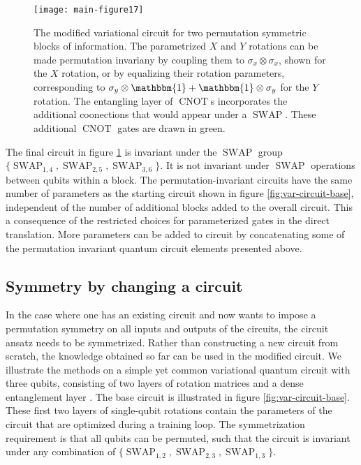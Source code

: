 \documentclass[%
 reprint,
 amsmath,amssymb,
 aps,
]{revtex4-2}
\newcommand{\SWAP}{\operatorname{SWAP}}
\newcommand{\CNOT}{\operatorname{CNOT}}
\theoremstyle{definition}%
\begin{document}
\begin{figure}[h]
    \centering
\texttt{[image: main-figure17]}
    \caption{The modified variational circuit for two permutation symmetric blocks of information. The parametrized $X$ and $Y$ rotations can be made permutation invariany by coupling them to $\sigma_x \otimes \sigma_x$, shown for the $X$ rotation, or by equalizing their rotation parameters, corresponding to $\sigma_y \otimes \mathbbm{1} + \mathbbm{1} \otimes \sigma_y$ for the $Y$ rotation. The entangling layer of $\CNOT$s incorporates the additional coonections that would appear under a $\SWAP$. These additional $\CNOT$ gates are drawn in green.}
    \label{fig:gate-difference}
\end{figure}

The final circuit in figure \ref{fig:gate-difference} is invariant under the $\SWAP$ group $\{\SWAP_{1, 4}, \SWAP_{2, 5}, \SWAP_{3, 6}\}$. It is not invariant under $\SWAP$ operations between qubits within a block. The permutation-invariant circuits have the same number of parameters as the starting circuit shown in figure \ref{fig:var-circuit-base}, independent of the number of additional blocks added to the overall circuit. This a consequence of the restricted choices for parameterized gates in the direct translation. More parameters can be added to circuit by concatenating some of the permutation invariant quantum circuit elements presented above.


\subsection{Symmetry by changing a circuit}

In the case where one has an existing circuit and now wants to impose a permutation symmetry on all inputs and outputs of the circuits, the circuit ansatz needs to be symmetrized. Rather than constructing a new circuit from scratch, the knowledge obtained so far can be used in the modified circuit. We illustrate the methods on a simple yet common variational quantum circuit with three qubits, consisting of two layers of rotation matrices and a dense entanglement layer \cite{schuld_variational_2021}. The base circuit is illustrated in figure \ref{fig:var-circuit-base}. These first two layers of single-qubit rotations contain the parameters of the circuit that are optimized during a training loop. The symmetrization requirement is that all qubits can be permuted, such that the circuit is invariant under any combination of $\{\SWAP_{1,2}, \SWAP_{2,3}, \SWAP_{1,3}\}$.
\end{document}
